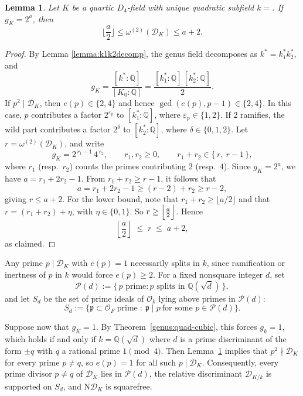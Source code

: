 \documentclass[11pt,reqno]{amsart}
\newcommand{\fp}{\mathfrak{p}}
\newcommand{\Q}{\mathbb{Q}}
\newcommand{\cD}{\mathcal{D}}
\newcommand{\cO}{\mathcal{O}}
\newcommand{\cP}{\mathcal{P}}
\newtheorem{lemma}[theorem]{Lemma}
\theoremstyle{definition}
\theoremstyle{remark}
\begin{document}
\begin{lemma}\label{lem:omega2-genus}
Let $K$ be a quartic $D_4$-field with unique quadratic subfield $k=$. If $g_K=2^{a}$, then
\[
\Big\lfloor\frac{a}{2}\Big\rfloor
\le \omega^{(2)}(\mathcal{D}_K)
\le a+2.
\]
\end{lemma}

\begin{proof}
By Lemma \ref{lemma:k1k2decomp}, the genus field decomposes as
$k^{*}=k_1^{*}k_2^{*}$, and
$$
g_K
=\frac{[k^{*}:\Q]}{[K_0:\Q]}
=\frac{[k_1^{*}:\Q]\,[k_2^{*}:\Q]}{2}.
$$
If $p^{2}\mid\cD_K$, then $e(p)\in\{2,4\}$ and hence
$\gcd(e(p),p-1)\in\{2,4\}$. In this case, $p$ contributes a factor
$2^{\varepsilon_p}$ to $[k_1^{*}:\Q]$, where $\varepsilon_p\in\{1,2\}$. If $2$ ramifies, the wild part contributes a factor $2^{\delta}$ to $[k_2^{*}:\Q]$, where $\delta\in\{0,1,2\}$. Let $r=\omega^{(2)}(\cD_K)$, and write
$$
g_K = 2^{\,r_1-1}\,4^{\,r_2},
\qquad
r_1,r_2\ge0,\qquad
r_1+r_2\in\{\,r,\ r-1\,\},
$$
where $r_1$ (resp.\ $r_2$) counts the primes contributing $2$ (resp.\ $4$).
Since $g_K=2^{a}$, we have
$ a = r_1 + 2r_2 - 1$. From $r_1+r_2 \ge r-1$, it follows that 
\[ a = r_1+2r_2 -1 \ge (r-2)+r_2 \ge r-2, \] 
giving $r \le a+2$. For the lower bound, note that $r_1+r_2 \ge \lfloor a/2\rfloor$ and that $r = (r_1+r_2) + \eta$, with $\eta\in\{0,1\}$. So $ r\ge \Bigl\lfloor \frac{a}{2} \Bigr\rfloor$.  Hence \[ \left\lfloor \frac{a}{2} \right\rfloor \;\le\; r \;\le\; a+2, \] as claimed. 
\end{proof}


\noindent
Any prime $p \mid \mathcal{D}_K$ with $e(p)=1$ necessarily splits in $k$, 
since ramification or inertness of $p$ in $k$ would force $e(p)\geq 2$. For a fixed nonsquare integer $d$, set
\[
\mathcal{P}(d) := \{\, p \text{ prime} : p \text{ splits in } \mathbb{Q}(\sqrt{d})\,\},
\]
and let $S_d$ be the set of prime ideals of $\cO_k$ lying above primes in
$\cP(d)$:
$$
S_d:=\{\fp\subset\cO_F \;\text{prime} \;:\ \fp\mid p\ \text{for some }p\in\cP(d)\}.
$$

Suppose now that $g_K = 1$. By Theorem~\ref{genus:quad-cubic}, this forces 
$g_k = 1$, which holds if and only if $k = \mathbb{Q}(\sqrt{d})$ where $d$ 
is a prime discriminant of the form $\pm q$ with $q$ a rational prime $1\pmod 4$. Then  Lemma~\ref{lem:omega2-genus}  implies that 
$p^2 \nmid \mathcal{D}_K$ for every prime $p \neq q$, so $e(p) = 1$ for all 
such $p \mid \mathcal{D}_K$. Consequently, every prime divisor $p \neq q$ of 
$\mathcal{D}_K$ lies in $\mathcal{P}(d)$, the relative discriminant 
$\mathcal{D}_{K/k}$ is supported on $S_d$, and $\mathrm{N}\mathcal{D}_K$ 
is squarefree.\\
\end{document}
